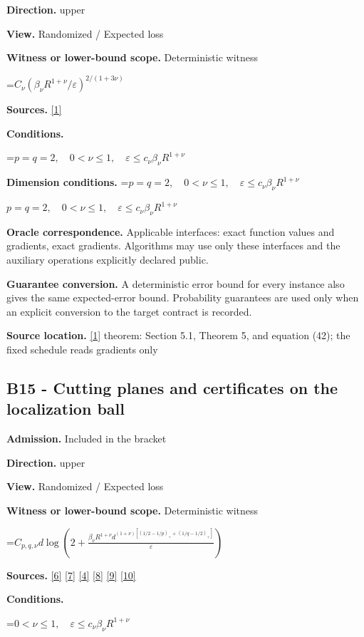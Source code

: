 \documentclass[10pt,a4paper]{article}
\newcommand{\AtlasMath}[1]{\par\begingroup\centering\setbox0=\hbox{$\displaystyle #1$}\ifdim\wd0>1.4\linewidth\typeout{ATLAS WIDE FORMULA: \the\wd0}\fi\ifdim\wd0>\linewidth\resizebox{\linewidth}{!}{\box0}\else\box0\fi\par\endgroup}
\newcommand{\AtlasInlineMath}[1]{\begingroup\setbox0=\hbox{$#1$}\ifdim\wd0>.4\linewidth\endgroup\AtlasMath{#1}\else\endgroup$#1$\fi}
\begin{document}
\textbf{Direction.} upper

\textbf{View.} Randomized / Expected loss

\textbf{Witness or lower-bound scope.} Deterministic witness

\AtlasMath{C_\nu(\beta_\nu R^{1+\nu}/\varepsilon)^{2/(1+3\nu)}}
\textbf{Sources.} \href{https://optimization-online.org/wp-content/uploads/2010/12/2865.pdf}{[1]}

\textbf{Conditions.} 
\AtlasMath{p=q=2,\quad0<\nu\le1,\quad\varepsilon\le c_\nu\beta_\nu R^{1+\nu}}


\textbf{Dimension conditions.} \AtlasInlineMath{p=q=2,\quad0<\nu\le1,\quad\varepsilon\le c_\nu\beta_\nu R^{1+\nu}}

\textbf{Oracle correspondence.} Applicable interfaces: exact function values and gradients, exact gradients. Algorithms may use only these interfaces and the auxiliary operations explicitly declared public.

\textbf{Guarantee conversion.} A deterministic error bound for every instance also gives the same expected-error bound. Probability guarantees are used only when an explicit conversion to the target contract is recorded.

\textbf{Source location.} \href{https://optimization-online.org/wp-content/uploads/2010/12/2865.pdf}{[1]} theorem: Section 5.1, Theorem 5, and equation (42); the fixed schedule reads gradients only

\subsection{B15 - Cutting planes and certificates on the localization ball}
\textbf{Admission.} Included in the bracket

\textbf{Direction.} upper

\textbf{View.} Randomized / Expected loss

\textbf{Witness or lower-bound scope.} Deterministic witness

\AtlasMath{C_{p,q,\nu}d\log\left(2+\frac{\beta_\nu R^{1+\nu}d^{(1+\nu)[(1/2-1/p)_++(1/q-1/2)_+]}}{\varepsilon}\right)}
\textbf{Sources.} \href{https://arxiv.org/pdf/2101.09740v2}{[6]} \href{https://arxiv.org/pdf/2609.33360v2}{[7]} \href{https://arxiv.org/pdf/2609.10874}{[4]} \href{https://arxiv.org/pdf/1405.4980}{[8]} \href{https://www2.isye.gatech.edu/~nemirovs/MOR_AccuracyCertificates.pdf}{[9]} \href{https://arxiv.org/pdf/2609.20701}{[10]}

\textbf{Conditions.} 
\AtlasMath{0<\nu\le1,\quad\varepsilon\le c_\nu\beta_\nu R^{1+\nu}}
\end{document}
